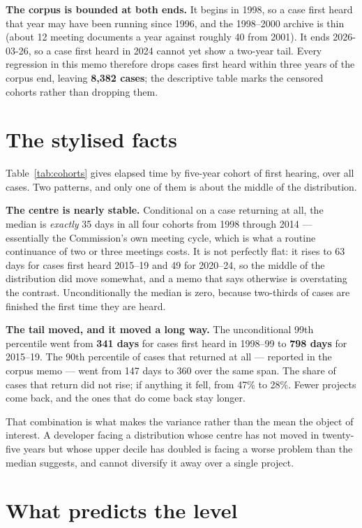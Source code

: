 \documentclass[11pt]{article}
\begin{document}
\textbf{The corpus is bounded at both ends.} It begins in 1998, so a case first heard that
year may have been running since 1996, and the 1998--2000 archive is thin (about 12 meeting
documents a year against roughly 40 from 2001). It ends 2026-03-26, so a case first heard in
2024 cannot yet show a two-year tail. Every regression in this memo therefore drops cases
first heard within three years of the corpus end, leaving \textbf{8{,}382 cases}; the
descriptive table marks the censored cohorts rather than dropping them.



\section{The stylised facts}

Table~\ref{tab:cohorts} gives elapsed time by five-year cohort of first hearing, over all
cases. Two patterns, and only one of them is about the middle of the distribution.

\textbf{The centre is nearly stable.} Conditional on a case returning at all, the median is
\emph{exactly} 35 days in all four cohorts from 1998 through 2014 --- essentially the
Commission's own meeting cycle, which is what a routine continuance of two or three meetings
costs. It is not perfectly flat: it rises to 63 days for cases first heard 2015--19 and 49 for
2020--24, so the middle of the distribution did move somewhat, and a memo that says otherwise
is overstating the contrast. Unconditionally the median is zero, because two-thirds of cases
are finished the first time they are heard.

\textbf{The tail moved, and it moved a long way.} The unconditional 99th percentile went from
\textbf{341 days} for cases first heard in 1998--99 to \textbf{798 days} for 2015--19. The
90th percentile of cases that returned at all --- reported in the corpus memo --- went from
147 days to 360 over the same span. The share of cases that return did not rise; if anything
it fell, from 47\% to 28\%. Fewer projects come back, and the ones that do come back stay
longer.

That combination is what makes the variance rather than the mean the object of interest. A
developer facing a distribution whose centre has not moved in twenty-five years but whose
upper decile has doubled is facing a worse problem than the median suggests, and cannot
diversify it away over a single project.

\section{What predicts the level}
\end{document}
